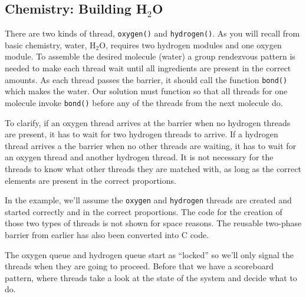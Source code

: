 \subsection*{Chemistry: Building H$_{2}$O}
There are two kinds of thread, \texttt{oxygen()} and \texttt{hydrogen()}. As you will recall from basic chemistry, water, H$_{2}$O, requires two hydrogen modules and one oxygen module. To assemble the desired molecule (water) a group rendezvous pattern is needed to make each thread wait until all ingredients are present in the correct amounts. As each thread passes the barrier, it should call the function \texttt{bond()} which makes the water. Our solution must function so that all threads for one molecule invoke \texttt{bond()} before any of the threads from the next molecule do.

To clarify, if an oxygen thread arrives at the barrier when no hydrogen threads are present, it has to wait for two hydrogen threads to arrive. If a hydrogen thread arrives a the barrier when no other threads are waiting, it has to wait for an oxygen thread and another hydrogen thread. It is not necessary for the threads to know what other threads they are matched with, as long as the correct elements are present in the correct proportions.

In the example, we'll assume the \texttt{oxygen} and \texttt{hydrogen} threads are created and started correctly and in the correct proportions. The code for the creation of those two types of threads is not shown for space reasons. The reusable two-phase barrier from earlier has also been converted into C code.

The oxygen queue and hydrogen queue start as ``locked'' so we'll only signal the threads when they are going to proceed. Before that we have a scoreboard pattern, where threads take a look at the state of the system and decide what to do.


